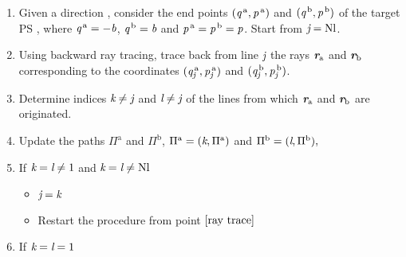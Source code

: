 \begin{enumerate}
\item Given a direction , consider the end points $(\textit{q}^{\,\textrm{a}}, \textit{p}^{\,\textrm{a}})$ and $(\textit{q}^{\,\textrm{b}}, \textit{p}^{\,\textrm{b}})$ of the target PS , where $\textit{q}^{\,\textrm{a}} = -\textit{b}$, $\textit{q}^{\,\textrm{b}} = \textit{b}$ and $\textit{p}^{\,\textrm{a}} = \textit{p}^{\,\textrm{b}} = \textit{p}$. Start from $\textit{j}=\textrm{Nl}$.
\item \label{ray trace} Using backward ray tracing, trace back from line $\textit{j}$ the rays $\textit{\textbf{r}}_{\textrm{a}}$ and $\textit{\textbf{r}}_\textrm{b}$ corresponding to the coordinates  $(\textit{q}_{\textit{j}}^{\,\textrm{a}}, \textit{p}_{\textit{j}}^{\,\textrm{a}})$ and $ (\textit{q}_{\textit{j}}^{\,\textrm{b}}, \textit{p}_{\textit{j}}^{\,\textrm{b}})$. 
\item Determine indices $\textit{k}\neq\textit{j}$ and $\textit{l}\neq\textit{j}$ of the lines from which  $\textit{\textbf{r}}_{\textrm{a}}$ and $\textit{\textbf{r}}_{\textrm{b}}$ are originated.\\
\item Update the paths $\Pi^\textrm{a}$ and $\Pi^\textrm{b}$, $\Pi^\textrm{a} = (\textit{k}, \Pi^{\textrm{a}})$ and $\Pi^\textrm{b} = (\textit{l}, \Pi^\textrm{b}),$
\item If $\textit{k}=\textit{l} \neq 1$ and $\textit{k}=\textit{l} \neq \textrm{Nl}$
\begin{itemize}
\item $\textit{j}=\textit{k}$
\item Restart the procedure from point $\ref{ray trace}$
\end{itemize}
\item If $\textit{k}=\textit{l}= 1$ 
\begin{itemize}

\end{itemize}
\end{enumerate}
